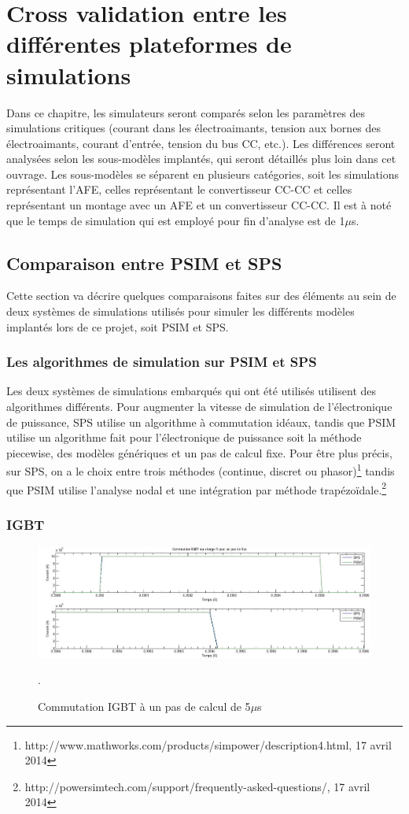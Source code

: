 \documentclass[11pt,letterpaper,final]{report}
\begin{document}
\chapter{Cross validation entre les différentes plateformes de simulations}
Dans ce chapitre, les simulateurs seront comparés selon les paramètres des simulations critiques (courant dans les électroaimants, tension aux bornes des électroaimants, courant d'entrée, tension du bus CC, etc.). Les différences seront analysées selon les sous-modèles implantés, qui seront détaillés plus loin dans cet ouvrage. Les sous-modèles se séparent en plusieurs catégories, soit les simulations représentant l'AFE, celles représentant le convertisseur CC-CC et celles représentant un montage avec un AFE et un convertisseur CC-CC. Il est à noté que le temps de simulation qui est employé pour fin d'analyse est de 1$\mu$s. 

\section{Comparaison entre PSIM et SPS}
Cette section va décrire quelques comparaisons faites sur des éléments au sein de deux systèmes de simulations utilisés pour simuler les différents modèles implantés lors de ce projet, soit PSIM et SPS.

\subsection{Les algorithmes de simulation sur PSIM et SPS}
Les deux systèmes de simulations embarqués qui ont été utilisés utilisent des algorithmes différents. Pour augmenter la vitesse de simulation de l'électronique de puissance, SPS utilise un algorithme à commutation idéaux, tandis que PSIM utilise un algorithme fait pour l'électronique de puissance soit la méthode piecewise, des modèles génériques et un pas de calcul fixe. Pour être plus précis, sur SPS, on a le choix entre trois méthodes (continue, discret ou phasor)\footnote{http://www.mathworks.com/products/simpower/description4.html, 17 avril 2014} tandis que PSIM utilise l'analyse nodal et une intégration par méthode trapézoïdale.\footnote{http://powersimtech.com/support/frequently-asked-questions/, 17 avril 2014}

\subsection{IGBT}

\begin{figure}[htb]
\centering
\includegraphics[scale=0.5]{Fig/Comp/IGBT.jpg}
\caption{Commutation IGBT à un pas de calcul de 5$\mu$s}.
\label{IG}
\end{figure}
\end{document}
